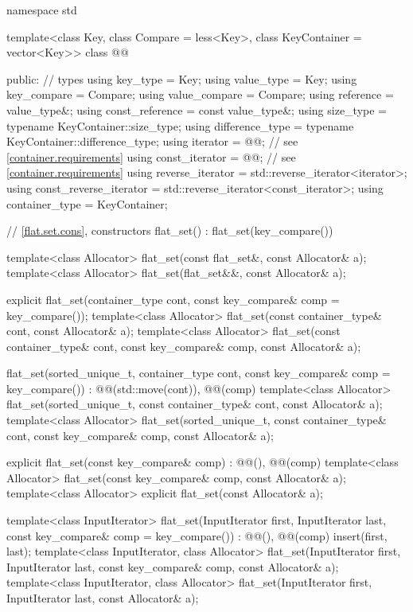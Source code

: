 \begin{codeblock}
namespace std {
  template<class Key, class Compare = less<Key>, class KeyContainer = vector<Key>>
  class @@ {
  public:
    // types
    using key_type                  = Key;
    using value_type                = Key;
    using key_compare               = Compare;
    using value_compare             = Compare;
    using reference                 = value_type&;
    using const_reference           = const value_type&;
    using size_type                 = typename KeyContainer::size_type;
    using difference_type           = typename KeyContainer::difference_type;
    using iterator                  = @@;  // see \ref{container.requirements}
    using const_iterator            = @@;  // see \ref{container.requirements}
    using reverse_iterator          = std::reverse_iterator<iterator>;
    using const_reverse_iterator    = std::reverse_iterator<const_iterator>;
    using container_type            = KeyContainer;

    // \ref{flat.set.cons}, constructors
    flat_set() : flat_set(key_compare()) { }

    template<class Allocator>
      flat_set(const flat_set&, const Allocator& a);
    template<class Allocator>
      flat_set(flat_set&&, const Allocator& a);

    explicit flat_set(container_type cont, const key_compare& comp = key_compare());
    template<class Allocator>
      flat_set(const container_type& cont, const Allocator& a);
    template<class Allocator>
      flat_set(const container_type& cont, const key_compare& comp, const Allocator& a);

    flat_set(sorted_unique_t, container_type cont, const key_compare& comp = key_compare())
      : @@(std::move(cont)), @@(comp) { }
    template<class Allocator>
      flat_set(sorted_unique_t, const container_type& cont, const Allocator& a);
    template<class Allocator>
      flat_set(sorted_unique_t, const container_type& cont,
               const key_compare& comp, const Allocator& a);

    explicit flat_set(const key_compare& comp)
      : @@(), @@(comp) { }
    template<class Allocator>
      flat_set(const key_compare& comp, const Allocator& a);
    template<class Allocator>
      explicit flat_set(const Allocator& a);

    template<class InputIterator>
      flat_set(InputIterator first, InputIterator last, const key_compare& comp = key_compare())
        : @@(), @@(comp)
        { insert(first, last); }
    template<class InputIterator, class Allocator>
      flat_set(InputIterator first, InputIterator last,
               const key_compare& comp, const Allocator& a);
    template<class InputIterator, class Allocator>
      flat_set(InputIterator first, InputIterator last, const Allocator& a);

}}
\end{codeblock}
